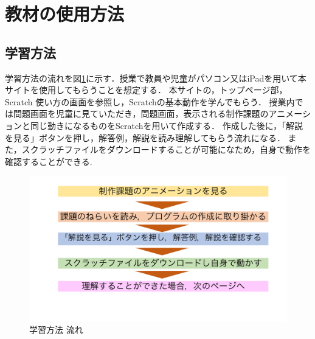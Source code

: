 \clearpage

\section{\rm 教材の使用方法}

\subsection{学習方法}
学習方法の流れを図\ref{fig:gakunagare}に示す．授業で教員や児童がパソコン又はiPadを用いて本サイトを使用してもらうことを想定する．
本サイトの，トップページ部，Scratch 使い方の画面を参照し，Scratchの基本動作を学んでもらう．
授業内では問題画面を児童に見ていただき，問題画面，表示される制作課題のアニメーションと同じ動きになるものをScratchを用いて作成する．
作成した後に，「解説を見る」ボタンを押し，解答例，解説を読み理解してもらう流れになる．
また，スクラッチファイルをダウンロードすることが可能になため，自身で動作を確認することができる.
\begin{figure}[h]
\begin{center}
\includegraphics[width=15cm]{gakushuu.pdf}
\caption{学習方法 流れ}
\label{fig:gakunagare}
\end{center}
\end{figure}
